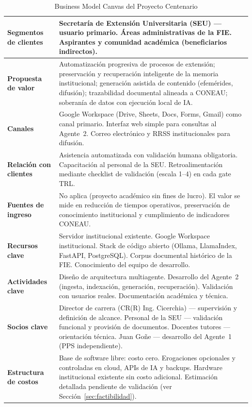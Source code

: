 \documentclass[a4paper, 12pt]{article}
\begin{document}
\begin{table}[htbp]
  \centering
  \caption{Business Model Canvas del Proyecto Centenario}
  \label{tab:bmc}
  \footnotesize
  \begin{tabularx}{\textwidth}{|l|X|}
    \hline
    \textbf{Segmentos de clientes} &
    Secretar\'ia de Extensi\'on Universitaria (SEU) --- usuario primario. \'Areas administrativas de la FIE. Aspirantes y comunidad acad\'emica (beneficiarios indirectos). \\
    \hline
    \textbf{Propuesta de valor} &
    Automatizaci\'on progresiva de procesos de extensi\'on; preservaci\'on y recuperaci\'on inteligente de la memoria institucional; generaci\'on asistida de contenido (efem\'erides, difusi\'on); trazabilidad documental alineada a CONEAU; soberan\'ia de datos con ejecuci\'on local de IA. \\
    \hline
    \textbf{Canales} &
    Google Workspace (Drive, Sheets, Docs, Forms, Gmail) como canal primario. Interfaz web simple para consultas al Agente~2. Correo electr\'onico y RRSS institucionales para difusi\'on. \\
    \hline
    \textbf{Relaci\'on con clientes} &
    Asistencia automatizada con validaci\'on humana obligatoria. Capacitaci\'on al personal de la SEU. Retroalimentaci\'on mediante checklist de validaci\'on (escala 1--4) en cada gate TRL. \\
    \hline
    \textbf{Fuentes de ingreso} &
    No aplica (proyecto acad\'emico sin fines de lucro). El valor se mide en reducci\'on de tiempos operativos, preservaci\'on de conocimiento institucional y cumplimiento de indicadores CONEAU. \\
    \hline
    \textbf{Recursos clave} &
    Servidor institucional existente. Google Workspace institucional. Stack de c\'odigo abierto (Ollama, LlamaIndex, FastAPI, PostgreSQL). Corpus documental hist\'orico de la FIE. Conocimiento del equipo de desarrollo. \\
    \hline
    \textbf{Actividades clave} &
    Dise\~no de arquitectura multiagente. Desarrollo del Agente~2 (ingesta, indexaci\'on, generaci\'on, recuperaci\'on). Validaci\'on con usuarios reales. Documentaci\'on acad\'emica y t\'ecnica. \\
    \hline
    \textbf{Socios clave} &
    Director de carrera (CR(R) Ing. Cicerchia) --- supervisi\'on y definici\'on de alcance. Personal de la SEU --- validaci\'on funcional y provisi\'on de documentos. Docentes tutores --- orientaci\'on t\'ecnica. Juan Go\~ne --- desarrollo del Agente~1 (PPS independiente). \\
    \hline
    \textbf{Estructura de costos} &
    Base de software libre: costo cero. Erogaciones opcionales y controladas en cloud, APIs de IA y backups. Hardware institucional existente sin costo adicional. Estimaci\'on detallada pendiente de validaci\'on (ver Secci\'on~\ref{sec:factibilidad}). \\
    \hline
  \end{tabularx}
\end{table}
\end{document}
